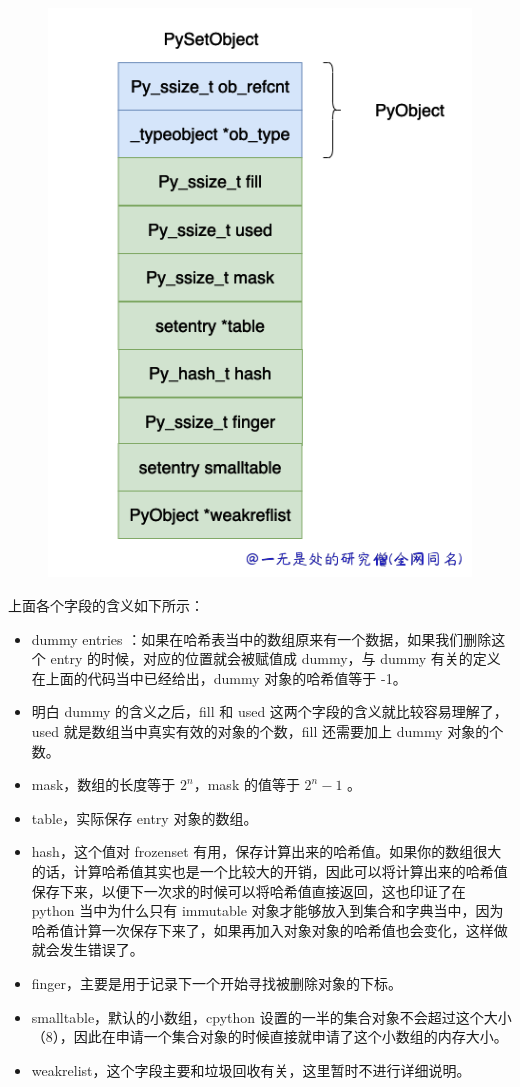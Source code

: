     \begin{figure}[H]
        \centering
            \includegraphics[scale=.5]{images/25-set.png}
            \caption{ }
        \label{fig:my_label}
    \end{figure}
    
上面各个字段的含义如下所示：
\begin{itemize}
\setlength{\itemsep}{0mm}
\item dummy entries ：如果在哈希表当中的数组原来有一个数据，如果我们删除这个 entry 的时候，对应的位置就会被赋值成 dummy，与 dummy 有关的定义在上面的代码当中已经给出，dummy 对象的哈希值等于 -1。 
\item 明白 dummy 的含义之后，fill 和 used 这两个字段的含义就比较容易理解了，used 就是数组当中真实有效的对象的个数，fill 还需要加上 dummy 对象的个数。 
\item mask，数组的长度等于 $2^n$，mask 的值等于 $2^n - 1$ 。 
\item table，实际保存 entry 对象的数组。 
\item hash，这个值对 frozenset 有用，保存计算出来的哈希值。如果你的数组很大的话，计算哈希值其实也是一个比较大的开销，因此可以将计算出来的哈希值保存下来，以便下一次求的时候可以将哈希值直接返回，这也印证了在 python 当中为什么只有 immutable 对象才能够放入到集合和字典当中，因为哈希值计算一次保存下来了，如果再加入对象对象的哈希值也会变化，这样做就会发生错误了。 
\item finger，主要是用于记录下一个开始寻找被删除对象的下标。 
\item smalltable，默认的小数组，cpython 设置的一半的集合对象不会超过这个大小（8），因此在申请一个集合对象的时候直接就申请了这个小数组的内存大小。 
\item weakrelist，这个字段主要和垃圾回收有关，这里暂时不进行详细说明。 
\end{itemize}
